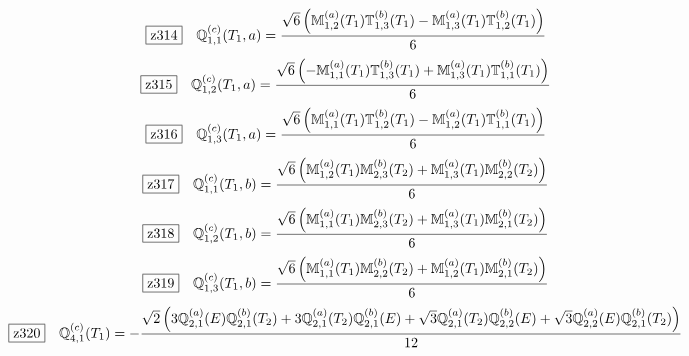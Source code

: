 \documentclass[fleqn,10pt,landscape]{jsarticle}
\begin{document}
\begin{dmath*}
\hspace*{3mm}\fbox{z314}\quad \mathbb{Q}_{1,1}^{(c)}(T_{1},a)=\frac{\sqrt{6} \left(\mathbb{M}_{1,2}^{(a)}(T_{1}) \mathbb{T}_{1,3}^{(b)}(T_{1}) - \mathbb{M}_{1,3}^{(a)}(T_{1}) \mathbb{T}_{1,2}^{(b)}(T_{1})\right)}{6}
\end{dmath*}
\begin{dmath*}
\hspace*{3mm}\fbox{z315}\quad \mathbb{Q}_{1,2}^{(c)}(T_{1},a)=\frac{\sqrt{6} \left(- \mathbb{M}_{1,1}^{(a)}(T_{1}) \mathbb{T}_{1,3}^{(b)}(T_{1}) + \mathbb{M}_{1,3}^{(a)}(T_{1}) \mathbb{T}_{1,1}^{(b)}(T_{1})\right)}{6}
\end{dmath*}
\begin{dmath*}
\hspace*{3mm}\fbox{z316}\quad \mathbb{Q}_{1,3}^{(c)}(T_{1},a)=\frac{\sqrt{6} \left(\mathbb{M}_{1,1}^{(a)}(T_{1}) \mathbb{T}_{1,2}^{(b)}(T_{1}) - \mathbb{M}_{1,2}^{(a)}(T_{1}) \mathbb{T}_{1,1}^{(b)}(T_{1})\right)}{6}
\end{dmath*}
\begin{dmath*}
\hspace*{3mm}\fbox{z317}\quad \mathbb{Q}_{1,1}^{(c)}(T_{1},b)=\frac{\sqrt{6} \left(\mathbb{M}_{1,2}^{(a)}(T_{1}) \mathbb{M}_{2,3}^{(b)}(T_{2}) + \mathbb{M}_{1,3}^{(a)}(T_{1}) \mathbb{M}_{2,2}^{(b)}(T_{2})\right)}{6}
\end{dmath*}
\begin{dmath*}
\hspace*{3mm}\fbox{z318}\quad \mathbb{Q}_{1,2}^{(c)}(T_{1},b)=\frac{\sqrt{6} \left(\mathbb{M}_{1,1}^{(a)}(T_{1}) \mathbb{M}_{2,3}^{(b)}(T_{2}) + \mathbb{M}_{1,3}^{(a)}(T_{1}) \mathbb{M}_{2,1}^{(b)}(T_{2})\right)}{6}
\end{dmath*}
\begin{dmath*}
\hspace*{3mm}\fbox{z319}\quad \mathbb{Q}_{1,3}^{(c)}(T_{1},b)=\frac{\sqrt{6} \left(\mathbb{M}_{1,1}^{(a)}(T_{1}) \mathbb{M}_{2,2}^{(b)}(T_{2}) + \mathbb{M}_{1,2}^{(a)}(T_{1}) \mathbb{M}_{2,1}^{(b)}(T_{2})\right)}{6}
\end{dmath*}
\begin{dmath*}
\hspace*{3mm}\fbox{z320}\quad \mathbb{Q}_{4,1}^{(c)}(T_{1})=- \frac{\sqrt{2} \left(3 \mathbb{Q}_{2,1}^{(a)}(E) \mathbb{Q}_{2,1}^{(b)}(T_{2}) + 3 \mathbb{Q}_{2,1}^{(a)}(T_{2}) \mathbb{Q}_{2,1}^{(b)}(E) + \sqrt{3} \mathbb{Q}_{2,1}^{(a)}(T_{2}) \mathbb{Q}_{2,2}^{(b)}(E) + \sqrt{3} \mathbb{Q}_{2,2}^{(a)}(E) \mathbb{Q}_{2,1}^{(b)}(T_{2})\right)}{12}
\end{dmath*}
\end{document}
